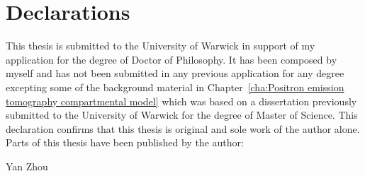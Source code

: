 \chapter*{Declarations}

This thesis is submitted to the University of Warwick in support of my
application for the degree of Doctor of Philosophy. It has been composed by
myself and has not been submitted in any previous application for any degree
excepting some of the background material in Chapter~\ref{cha:Positron
emission tomography compartmental model} which was based on a dissertation
previously submitted to the University of Warwick for the degree of Master of
Science. This declaration confirms that this thesis is original and sole work
of the author alone. Parts of this thesis have been published by the author:





\baselineskip
\noindent Yan Zhou
